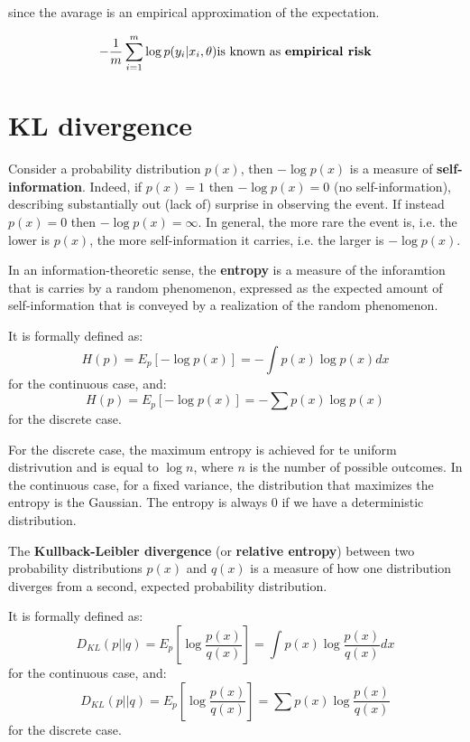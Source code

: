 since the avarage is an empirical approximation of the expectation.

\begin{observationblock}
$$
-\frac{1}{m}\sum_{i=1}^{m}\log p(y_i|x_i, \theta) \text{is known as \textbf{empirical risk}}
$$
\end{observationblock}



\section{KL divergence}

Consider a probability distribution $p(x)$, then $-\log p(x)$ is a measure of \textbf{self-information}. Indeed, if $p(x) = 1$ then $-\log p(x) = 0$ (no self-information), describing substantially out (lack of) surprise in observing the event. If instead $p(x) = 0$ then $-\log p(x) = \infty$. In general, the more rare the event is, i.e. the lower is $p(x)$, the more self-information it carries, i.e. the larger is $-\log p(x)$.

\begin{definitionblock}[Entropy]
    In an information-theoretic sense, the \textbf{entropy} is a measure of the inforamtion that is carries by a random phenomenon, expressed as the expected amount of self-information that is conveyed by a realization of the random phenomenon.
    
    It is formally defined as:
    $$
    H(p) = E_p[-\log p(x)] = -\int p(x) \log p(x) dx
    $$
    for the continuous case, and:
    $$
    H(p) = E_p[-\log p(x)] = -\sum p(x) \log p(x)
    $$
    for the discrete case.
\end{definitionblock}

For the discrete case, the maximum entropy is achieved for te uniform distrivution and is equal to $\log n$, where $n$ is the number of possible outcomes. In the continuous case, for a fixed variance, the distribution that maximizes the entropy is the Gaussian. The entropy is always 0 if we have a deterministic distribution.

\begin{definitionblock}
    The \textbf{Kullback-Leibler divergence} (or \textbf{relative entropy}) between two probability distributions $p(x)$ and $q(x)$ is a measure of how one distribution diverges from a second, expected probability distribution.
    
    It is formally defined as:
    $$
    D_{KL}(p||q) = E_p\left[\log \dfrac{p(x)}{q(x)}\right] = \int p(x) \log \dfrac{p(x)}{q(x)} dx
    $$
    for the continuous case, and:
    $$
    D_{KL}(p||q) = E_p\left[\log \dfrac{p(x)}{q(x)}\right] = \sum p(x) \log \dfrac{p(x)}{q(x)}
    $$
    for the discrete case.
\end{definitionblock}

